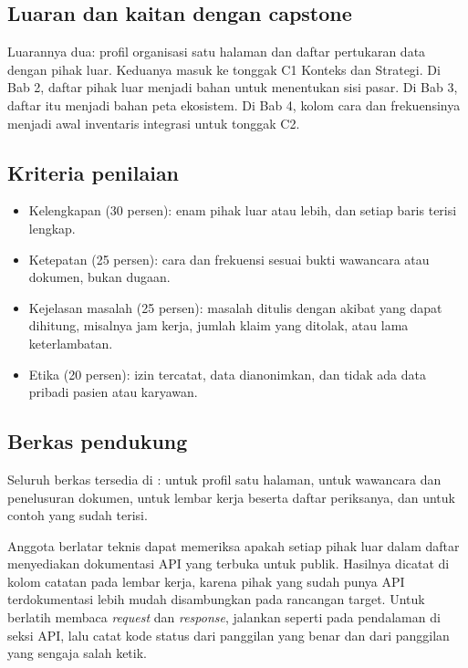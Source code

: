 \subsection*{Luaran dan kaitan dengan capstone}

Luarannya dua: profil organisasi satu halaman dan daftar pertukaran data dengan
pihak luar. Keduanya masuk ke tonggak C1 Konteks dan Strategi. Di Bab 2, daftar
pihak luar menjadi bahan untuk menentukan sisi pasar. Di Bab 3, daftar itu
menjadi bahan peta ekosistem. Di Bab 4, kolom cara dan frekuensinya menjadi awal
inventaris integrasi untuk tonggak C2.

\subsection*{Kriteria penilaian}

\begin{itemize}
  \item Kelengkapan (30 persen): enam pihak luar atau lebih, dan setiap baris
        terisi lengkap.
  \item Ketepatan (25 persen): cara dan frekuensi sesuai bukti wawancara atau
        dokumen, bukan dugaan.
  \item Kejelasan masalah (25 persen): masalah ditulis dengan akibat yang dapat
        dihitung, misalnya jam kerja, jumlah klaim yang ditolak, atau lama
        keterlambatan.
  \item Etika (20 persen): izin tercatat, data dianonimkan, dan tidak ada data
        pribadi pasien atau karyawan.
\end{itemize}

\subsection*{Berkas pendukung}

Seluruh berkas tersedia di :
 untuk profil satu halaman,
 untuk wawancara dan penelusuran dokumen,
 untuk lembar kerja beserta daftar periksanya,
dan  untuk contoh yang sudah terisi.

\begin{pendalaman}
Anggota berlatar teknis dapat memeriksa apakah setiap pihak luar dalam daftar
menyediakan dokumentasi API yang terbuka untuk publik. Hasilnya dicatat di kolom
catatan pada lembar kerja, karena pihak yang sudah punya API terdokumentasi lebih
mudah disambungkan pada rancangan target. Untuk berlatih membaca
\textit{request} dan \textit{response}, jalankan
 seperti pada pendalaman di seksi
API, lalu catat kode status dari panggilan yang benar dan dari panggilan yang
sengaja salah ketik.
\end{pendalaman}

